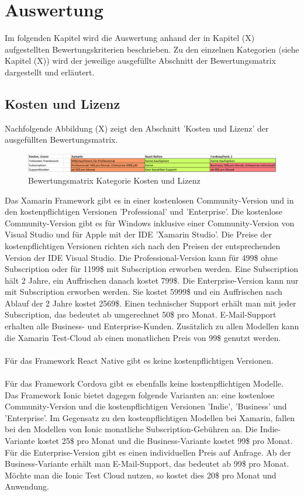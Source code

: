 \chapter{Auswertung}

Im folgenden Kapitel wird die Auswertung anhand der in Kapitel (X) aufgestellten Bewertungskriterien beschrieben. Zu den einzelnen Kategorien (siehe Kapitel (X)) wird der jeweilige ausgefüllte Abschnitt der Bewertungsmatrix dargestellt und erläutert. 

\section{Kosten und Lizenz}

Nachfolgende Abbildung (X) zeigt den Abschnitt 'Kosten und Lizenz' der ausgefüllten Bewertungsmatrix.

\begin{figure}[h]
	\centering
	\includegraphics[width=1\textwidth]{Bilder/Auswertung_KostenLizenz.PNG}
	\caption{Bewertungsmatrix Kategorie Kosten und Lizenz}
	\label{fig:AuswKostLiz}
\end{figure}

Das Xamarin Framework gibt es in einer kostenlosen Community-Version und in den kostenpflichtigen Versionen 'Professional' und 'Enterprise'. Die kostenlose Community-Version gibt es für Windows inklusive einer Community-Version von Visual Studio und für Apple mit der IDE 'Xamarin Studio'. Die Preise der kostenpflichtigen Versionen richten sich nach den Preisen der entsprechenden Version der IDE Visual Studio. Die Professional-Version kann für 499\$ ohne Subscription oder für 1199\$ mit Subscription erworben werden. Eine Subscription hält 2 Jahre, ein Auffrischen danach kostet 799\$. Die Enterprise-Version kann nur mit Subscription erworben werden. Sie kostet 5999\$ und ein Auffrischen nach Ablauf der 2 Jahre kostet 2569\$. Einen technischer Support  erhält man mit jeder Subscription, das bedeutet ab umgerechnet 50\$ pro Monat. E-Mail-Support erhalten alle Business- und Enterprise-Kunden. Zusätzlich zu allen Modellen kann die Xamarin Test-Cloud ab einen monatlichen Preis von 99\$ genutzt werden.
\\
\\
Für das Framework React Native gibt es keine kostenpflichtigen Versionen. 
\\
\\
Für das Framework Cordova gibt es ebenfalls keine kostenpflichtigen Modelle. Das Framework Ionic bietet dagegen folgende Varianten an: eine kostenlose Community-Version und die kostenpflichtigen Versionen 'Indie', 'Business' und 'Enterprise'. Im Gegensatz zu den kostenpflichtigen Modellen bei Xamarin, fallen bei den Modellen von Ionic monatliche Subscription-Gebühren an. Die Indie-Variante kostet 25\$ pro Monat und die Business-Variante kostet 99\$ pro Monat. Für die Enterprise-Version gibt es einen individuellen Preis auf Anfrage. Ab der Business-Variante erhält man E-Mail-Support, das bedeutet ab 99\$ pro Monat. Möchte man die Ionic Test Cloud nutzen, so kostet dies 20\$ pro Monat und Anwendung.  

